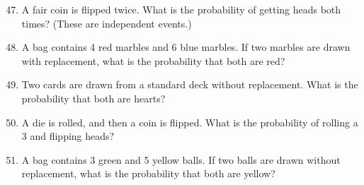 \documentclass[12pt]{article}
\begin{document}
\begin{enumerate}
\setcounter{enumi}{46}

\item A fair coin is flipped twice. What is the probability of getting heads both times? (These are independent events.)

\item A bag contains 4 red marbles and 6 blue marbles. If two marbles are drawn with replacement, what is the probability that both are red?

\item Two cards are drawn from a standard deck without replacement. What is the probability that both are hearts?

\item A die is rolled, and then a coin is flipped. What is the probability of rolling a 3 and flipping heads?

\item A bag contains 3 green and 5 yellow balls. If two balls are drawn without replacement, what is the probability that both are yellow?

\end{enumerate}
\end{document}
